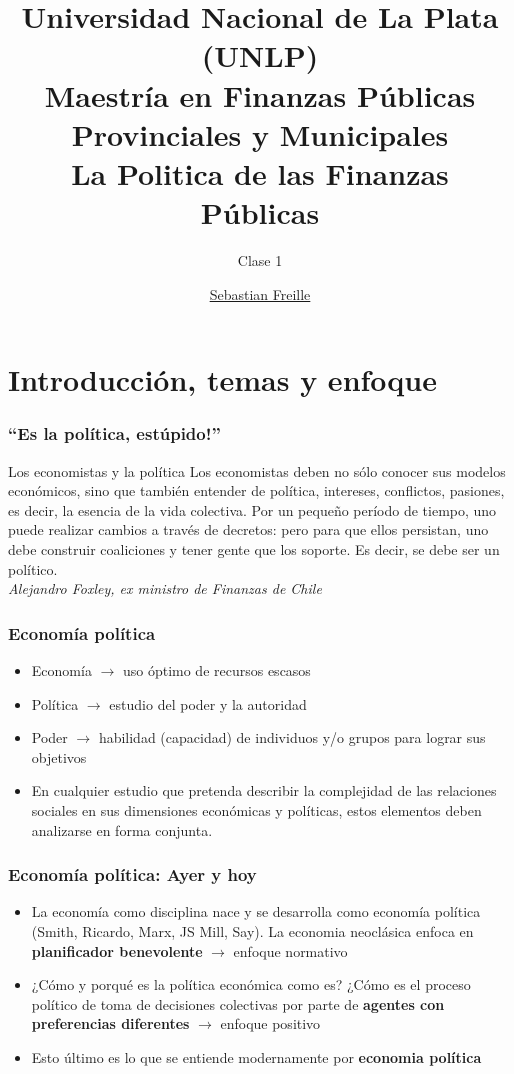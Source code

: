 \documentclass[14pt,aspectratio=169]{beamer}
\title{Universidad Nacional de La Plata (UNLP) \\ Maestría en Finanzas
  Públicas Provinciales y Municipales \\ La Politica de las Finanzas
  Públicas}
\subtitle{Clase 1}
\author{\underline{Sebastian Freille} \inst{1}}
\institute[IEF (FCE-UNC)]{\inst{1} Instituto de Economía y Finanzas (FCE-UNC)}
\date{}
\begin{document}
\maketitle


\section{Introducción, temas y enfoque}


\begin{frame}\frametitle{``Es la política, estúpido!''}
\begin{block}{Los economistas y la política}
Los economistas deben no sólo conocer sus modelos económicos, sino que
también entender de política, intereses, conflictos, pasiones, es
decir, la esencia de la vida colectiva. Por un pequeño período de
tiempo, uno puede realizar cambios a través de decretos: pero para que
ellos persistan, uno debe construir coaliciones y tener gente que los
soporte. Es decir, se debe ser un político. \\
\textit{Alejandro Foxley, ex ministro de Finanzas de Chile}
\end{block}
\end{frame}


\begin{frame}\frametitle{Economía política}
\begin{itemize}
\item Economía $\longrightarrow$ uso óptimo de recursos escasos
\item Política $\longrightarrow$ estudio del poder y la autoridad
\item Poder $\longrightarrow$ habilidad (capacidad) de individuos y/o
  grupos para lograr sus objetivos
\item En cualquier estudio que pretenda describir la complejidad de
  las relaciones sociales en sus dimensiones económicas y políticas,
  estos elementos deben analizarse en forma conjunta.
\end{itemize}
\end{frame}


\begin{frame}\frametitle{Economía política: Ayer y hoy}
\begin{itemize}
\item La economía como disciplina nace y se desarrolla como economía
  política (Smith, Ricardo, Marx, JS Mill, Say). La economia
  neoclásica enfoca en \textbf{planificador benevolente}
  $\longrightarrow$ enfoque normativo 
  \item ¿Cómo y porqué es la política económica como es? ¿Cómo es el
    proceso político de toma de decisiones colectivas por parte de
    \textbf{agentes con preferencias diferentes} $\longrightarrow$
    enfoque positivo
    \item Esto último es lo que se entiende modernamente por \textbf{economia política}
\end{itemize}
\end{frame}
\end{document}
